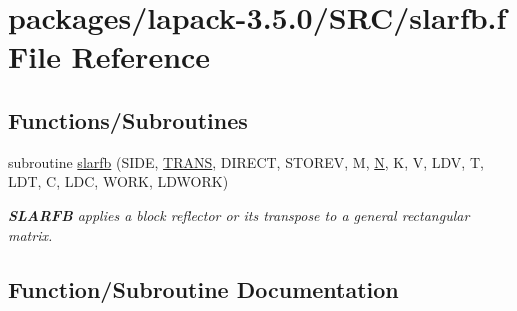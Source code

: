\hypertarget{slarfb_8f}{}\section{packages/lapack-\/3.5.0/\+S\+R\+C/slarfb.f File Reference}
\label{slarfb_8f}
\subsection*{Functions/\+Subroutines}
\begin{DoxyCompactItemize}
\item 
subroutine \hyperlink{slarfb_8f_abd00c98d81aee1efa14e838bafa8078a}{slarfb} (S\+I\+D\+E, \hyperlink{superlu__enum__consts_8h_a0c4e17b2d5cea33f9991ccc6a6678d62a1f61e3015bfe0f0c2c3fda4c5a0cdf58}{T\+R\+A\+N\+S}, D\+I\+R\+E\+C\+T, S\+T\+O\+R\+E\+V, M, \hyperlink{polmisc_8c_a0240ac851181b84ac374872dc5434ee4}{N}, K, V, L\+D\+V, T, L\+D\+T, C, L\+D\+C, W\+O\+R\+K, L\+D\+W\+O\+R\+K)
\begin{DoxyCompactList}\small\item\em {\bfseries S\+L\+A\+R\+F\+B} applies a block reflector or its transpose to a general rectangular matrix. \end{DoxyCompactList}\end{DoxyCompactItemize}


\subsection{Function/\+Subroutine Documentation}
\hypertarget{slarfb_8f_abd00c98d81aee1efa14e838bafa8078a}{}
